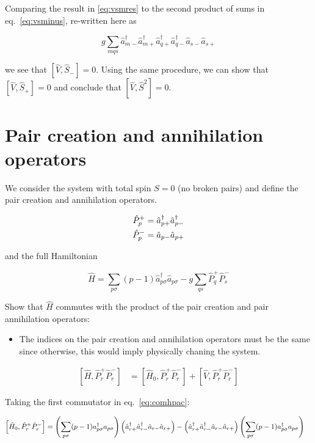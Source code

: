 \documentclass[11pt]{article}
\newcommand{\cop}[2]{%
	\ensuremath{ \hat{a} _{#1 #2} ^{\dagger} }}
\newcommand{\aop}[2]{%
	\ensuremath{ \hat{a} _{#1 #2} }}
\newcommand{\pcop}[1]{%
	\ensuremath{ \cop{#1}{+} \cop{#1}{-} } }
\newcommand{\paop}[1]{%
	\ensuremath{ \aop{#1}{-} \aop{#1}{+} } }
\newcommand{\hzero}[2]{%
	\ensuremath{ \sum_{#1 #2} (#1-1) a _{#1 #2} ^{\dagger} a _{#1 #2} }}
\newcommand{\hfull}[4]{%
	\ensuremath{\sum_{#1 #2} (#1 - 1) \cop{#1}{#2} \aop{#1}{#2} - g \sum_{#3 #4} \hat{P} ^+ _{#3} \hat{P} ^- _{#4}  } }
\newcommand{\sop}[1]{%
	\ensuremath{ \hat{S}_{#1} } }
\newcommand{\hop}{
	\ensuremath{ \hat{H} _0 }}
\newcommand{\ssop}{
	\ensuremath{ \hat{S} ^2} }
\newcommand{\vop}{
	\ensuremath{ \hat{V} } }
\newcommand{\ppop}[1]{%
	\ensuremath{ \hat{P} _{#1} ^+ } }
\newcommand{\pmop}[1]{%
	\ensuremath{ \hat{P} _{#1} ^- } }
\newcommand{\commutator}[2]{%
	\ensuremath{ \left [ #1,#2 \right ] }}
\begin{document}
Comparing the result in \ref{eq:vsmres} to the second product of sums in eq.~\ref{eq:vsminus}, re-written here as

\begin{equation}
	g \sum _{m q s} \cop{m}{-} \cop{m}{+} \cop{q}{+} \cop{q}{-} \aop{s}{-} \aop{s}{+} \nonumber
\end{equation}

we see that $ \commutator{\vop}{\sop{-}} = 0$. Using the same procedure, we can show that $ \commutator{\vop}{\sop{+}} = 0$ and conclude that $ \commutator{\vop}{\ssop} = 0$.

\section*{Pair creation and annihilation operators}

We consider the system with total spin $S=0$ (no broken pairs) and define the pair creation and annihilation operators.

\begin{align*}
\begin{split}
	\hat{P} _p ^+ &= \pcop{p}\\
	\hat{P} _p ^- &= \paop{p}
\end{split}
\end{align*}

and the full Hamiltonian

\begin{equation}
	\hat{H} = \hfull{p}{\sigma}{q}{s}
\label{eq:fullham}
\end{equation}

Show that $\hat{H}$ commutes with the product of the pair creation and pair annihilation operators:
\begin{itemize}
	\item The indices on the pair creation and annihilation operators must be the same since otherwise, this would imply physically chaning the system.
\end{itemize}

\begin{align}\label{eq:comhpac}
	\commutator{\hat{H}}{ \ppop{r} \pmop{r}} &= \commutator{\hat{H} _0}{ \ppop{r} \pmop{r}} + \commutator{\vop}{\ppop{r} \pmop{r}}
\end{align}

Taking the first commutator in eq.~\ref{eq:comhpac}:

\begin{align*}
	\commutator{\hop}{ \ppop{r} \pmop{r}} &= \left ( \hzero{p}{\sigma} \right ) \left ( \pcop{r} \paop{r} \right ) - \left ( \pcop{r} \paop{r} \right ) \left ( \hzero{p}{\sigma} \right )
\end{align*}
\end{document}
